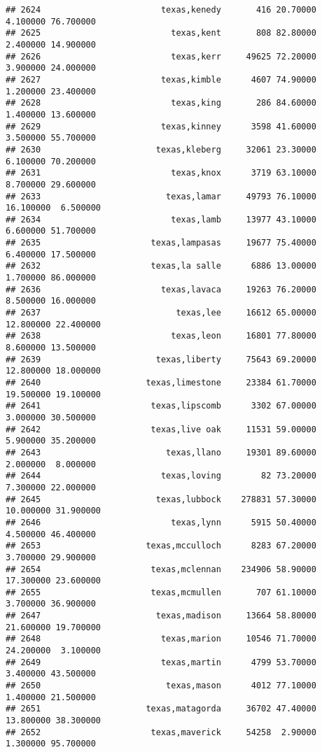\documentclass[
]{article}
\begin{document}
\begin{verbatim}
## 2624                        texas,kenedy       416 20.70000  4.100000 76.700000
## 2625                          texas,kent       808 82.80000  2.400000 14.900000
## 2626                          texas,kerr     49625 72.20000  3.900000 24.000000
## 2627                        texas,kimble      4607 74.90000  1.200000 23.400000
## 2628                          texas,king       286 84.60000  1.400000 13.600000
## 2629                        texas,kinney      3598 41.60000  3.500000 55.700000
## 2630                       texas,kleberg     32061 23.30000  6.100000 70.200000
## 2631                          texas,knox      3719 63.10000  8.700000 29.600000
## 2633                         texas,lamar     49793 76.10000 16.100000  6.500000
## 2634                          texas,lamb     13977 43.10000  6.600000 51.700000
## 2635                      texas,lampasas     19677 75.40000  6.400000 17.500000
## 2632                      texas,la salle      6886 13.00000  1.700000 86.000000
## 2636                        texas,lavaca     19263 76.20000  8.500000 16.000000
## 2637                           texas,lee     16612 65.00000 12.800000 22.400000
## 2638                          texas,leon     16801 77.80000  8.600000 13.500000
## 2639                       texas,liberty     75643 69.20000 12.800000 18.000000
## 2640                     texas,limestone     23384 61.70000 19.500000 19.100000
## 2641                      texas,lipscomb      3302 67.00000  3.000000 30.500000
## 2642                      texas,live oak     11531 59.00000  5.900000 35.200000
## 2643                         texas,llano     19301 89.60000  2.000000  8.000000
## 2644                        texas,loving        82 73.20000  7.300000 22.000000
## 2645                       texas,lubbock    278831 57.30000 10.000000 31.900000
## 2646                          texas,lynn      5915 50.40000  4.500000 46.400000
## 2653                     texas,mcculloch      8283 67.20000  3.700000 29.900000
## 2654                      texas,mclennan    234906 58.90000 17.300000 23.600000
## 2655                      texas,mcmullen       707 61.10000  3.700000 36.900000
## 2647                       texas,madison     13664 58.80000 21.600000 19.700000
## 2648                        texas,marion     10546 71.70000 24.200000  3.100000
## 2649                        texas,martin      4799 53.70000  3.400000 43.500000
## 2650                         texas,mason      4012 77.10000  1.400000 21.500000
## 2651                     texas,matagorda     36702 47.40000 13.800000 38.300000
## 2652                      texas,maverick     54258  2.90000  1.300000 95.700000

\end{verbatim}
\end{document}
